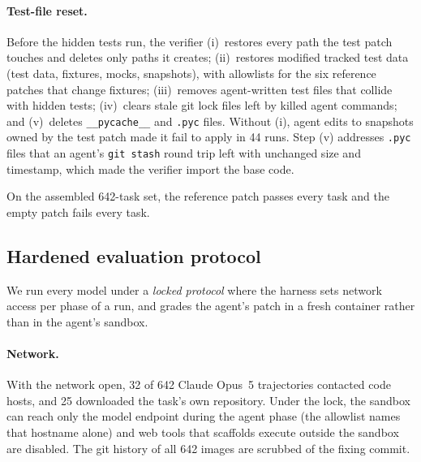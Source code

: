 \paragraph{Test-file reset.}
Before the hidden tests run, the verifier (i)~restores every path the test patch touches and deletes only paths it creates; (ii)~restores modified tracked test data (test data, fixtures, mocks, snapshots), with allowlists for the six reference patches that change fixtures; (iii)~removes agent-written test files that collide with hidden tests; (iv)~clears stale git lock files left by killed agent commands; and (v)~deletes \texttt{\_\_pycache\_\_} and \texttt{.pyc} files. Without (i), agent edits to snapshots owned by the test patch made it fail to apply in 44 runs. Step (v) addresses \texttt{.pyc} files that an agent's \texttt{git stash} round trip left with unchanged size and timestamp, which made the verifier import the base code.

On the assembled 642-task set, the reference patch passes every task and the empty patch fails every task.


\subsection{Hardened evaluation protocol}
\label{sec:protocol}

We run every model under a \textit{locked protocol} where the harness sets network access per phase of a run, and grades the agent's patch in a fresh container rather than in the agent's sandbox. 

\paragraph{Network.}
With the network open, 32 of 642 Claude Opus~5 trajectories contacted code hosts, and 25 downloaded the task's own repository. Under the lock, the sandbox can reach only the model endpoint during the agent phase (the allowlist names that hostname alone) and web tools that scaffolds execute outside the sandbox are disabled.  The git history of all 642 images are scrubbed of the fixing commit.

